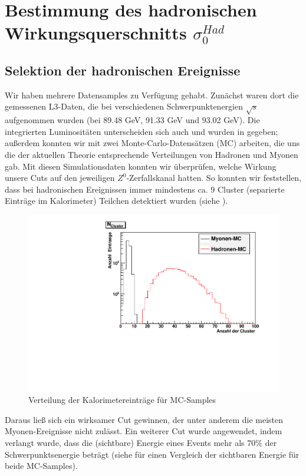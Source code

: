 \section{Bestimmung des hadronischen Wirkungsquerschnitts $\sigma_0^{Had}$}
\subsection{Selektion der hadronischen Ereignisse}
Wir haben mehrere Datensamples zu Verfügung gehabt. Zunächst waren dort die gemessenen L3-Daten, die bei verschiedenen Schwerpunktenergien $\sqrt{s}$ aufgenommen wurden (bei 89.48 GeV, 91.33 GeV und 93.02 GeV). Die integrierten Luminositäten unterscheiden sich auch und wurden in \cite[S.9]{script} gegeben; außerdem konnten wir mit zwei Monte-Carlo-Datensätzen (MC) arbeiten, die uns die der aktuellen Theorie entsprechende Verteilungen von Hadronen und Myonen gab. Mit diesen Simulationsdaten konnten wir überprüfen, welche Wirkung unsere Cuts auf den jeweiligen $Z^0$-Zerfallskanal hatten. So konnten wir feststellen, dass bei hadronischen Ereignissen immer mindestens ca. 9 Cluster (separierte Einträge im Kalorimeter) Teilchen detektiert wurden (siehe ).
\begin{figure}[htb]
	\centering
	\includegraphics[width=1\columnwidth,keepaspectratio]{Ncluster_vgl.pdf}
	\caption{Verteilung der Kalorimetereinträge für MC-Samples}
	\label{fig:Ncluster_vgl}
\end{figure}
Daraus ließ sich ein wirksamer Cut gewinnen, der unter anderem die meisten Myonen-Ereignisse nicht zulässt. Ein weiterer Cut wurde angewendet, indem verlangt wurde, dass die (sichtbare) Energie eines Events mehr als $70\%$ der Schwerpunktsenergie beträgt (siehe  für einen Vergleich der sichtbaren Energie für beide MC-Samples).
